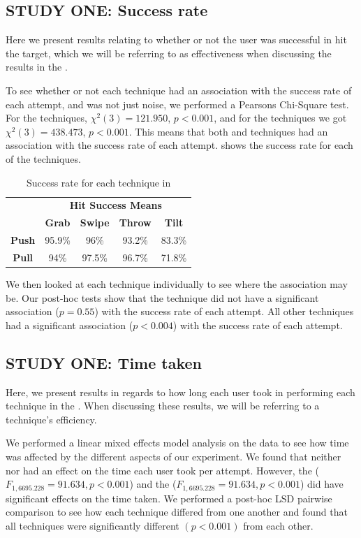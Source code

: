 \subsection{STUDY ONE: Success rate}
Here we present results relating to whether or not the user was successful in hit the target, which we will be referring to as effectiveness when discussing the results in the \target. 

To see whether or not each technique had an association with the success rate of each attempt, and was not just noise, we performed a Pearsons Chi-Square test.
For the \push techniques, $\chi^2(3)=121.950$, $p<0.001$, and for the \pull techniques we got $\chi^2(3)=438.473$, $p<0.001$. 
This means that both \push and \pull techniques had an association with the success rate of each attempt.
 shows the success rate for each of the techniques. 

\begin{table}[H]
	\centering
	\def\arraystretch{1.5}
		\begin{tabular}{c c c c c}
			& \multicolumn{4}{c}{\textbf{Hit Success Means}} \\
			\cline{2-5}
			& \textbf{Grab} & \textbf{Swipe} & \textbf{Throw} & \textbf{Tilt} \\ \hline
			\textbf{Push} & 95.9\% & 96\% & 93.2\% & 83.3\% \\ \hline
			\textbf{Pull} & 94\% & 97.5\% & 96.7\% & 71.8\% \\ \hline
		\end{tabular}
	\caption{Success rate for each technique in \studyone}
	\label{tab:successRate}
\end{table}

We then looked at each technique individually to see where the association may be.
Our post-hoc tests show that the \throw \push technique did not have a significant association ($p=0.55$) with the success rate of each attempt.
All other techniques had a significant association ($p<0.004$) with the success rate of each attempt. 

\subsection{STUDY ONE: Time taken}
Here, we present results in regards to how long each user took in performing each technique in the \target. 
When discussing these results, we will be referring to a technique's efficiency.

We performed a linear mixed effects model analysis on the data to see how time was affected by the different aspects of our experiment. 
We found that neither \effectiveness nor \direction had an effect on the time each user took per attempt. 
However, the \targetsize ($F_{1,6695.228} = 91.634, p < 0.001$) and the \technique ($F_{1,6695.228} = 91.634, p < 0.001$) did have significant effects on the time taken. 
We performed a post-hoc LSD pairwise comparison to see how each technique differed from one another and found that all techniques were significantly different $(p<0.001)$ from each other. 

